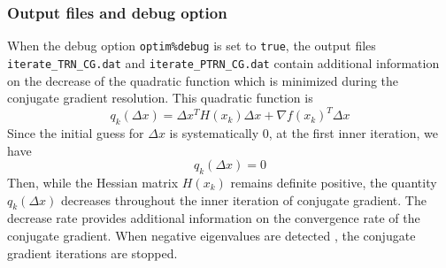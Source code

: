 \documentclass[a4paper,twoside,final,onecolumn,11pt,openright]{article}
\begin{document}
\subsubsection{Output files and debug option}
\label{qk}

When the debug option \texttt{optim\%debug} is set to \texttt{true}, the output files \texttt{iterate\_TRN\_CG.dat} and \texttt{iterate\_PTRN\_CG.dat} contain additional information on the decrease of the quadratic function which is minimized during the conjugate gradient resolution. This quadratic function is 
\begin{equation}
 q_k(\Delta x)= \Delta x^{T} H(x_k) \Delta x + \nabla f(x_k)^{T} \Delta x
\end{equation}
Since the initial guess for $\Delta x$ is systematically $0$, at the first inner iteration, we have 
\begin{equation}
 q_k(\Delta x)=0
\end{equation}
Then, while the Hessian matrix $H(x_k)$ remains definite positive, the quantity $q_k(\Delta x)$ decreases throughout the inner iteration of conjugate gradient. The decrease rate provides additional information on the convergence rate of the conjugate gradient. When negative eigenvalues are detected , the conjugate gradient iterations are stopped. 





\newpage 
\small


\end{document}
